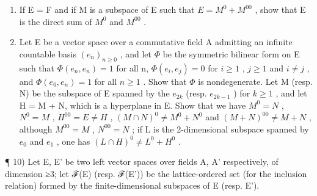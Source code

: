 \begin{enumerate}
\def\labelenumi{\alph{enumi})}
\setcounter{enumi}{2}
\item
  If E = F and if M is a subspace of E such that \(E = M^{0} + M^{00}\) , show that E is the direct sum of \(M^{0}\) and \(M^{00}\) .
\item
  Let E be a vector space over a commutative field A admitting an infinite countable basis \((e_{n})_{n\geqslant0}\) , and let \(\Phi\) be the symmetric bilinear form on E such that \(\Phi(e_{n}, e_{n}) = 1\) for all n, \(\Phi(e_{i}, e_{j}) = 0\) for \(i \geqslant 1\) , \(j \geqslant 1\) and \(i \neq j\) , and \(\Phi(e_{0}, e_{n}) = 1\) for all \(n \geqslant 1\) . Show that \(\Phi\) is nondegenerate. Let M (resp. N) be the subspace of E spanned by the \(e_{2k}\) (resp. \(e_{2k-1}\) ) for \(k \geqslant 1\) , and let H = M + N, which is a hyperplane in E. Show that we have \(M^{0} = N\) , \(N^{0} = M\) , \(H^{00} = E \neq H\) , \((M \cap N)^{0} \neq M^{0} + N^{0}\) and \((M + N)^{00} \neq M + N\) , although \(M^{00} = M\) , \(N^{00} = N\) ; if L is the 2-dimensional subspace spanned by \(e_{0}\) and \(e_{1}\) , one has \((L \cap H)^{0} \neq L^{0} + H^{0}\) .
\end{enumerate}

¶ 10) Let E, E' be two left vector spaces over fields A, A' respectively, of dimension ≥3; let ℱ(E) (resp. ℱ(E')) be the lattice-ordered set (for the inclusion relation) formed by the finite-dimensional subspaces of E (resp. E').

